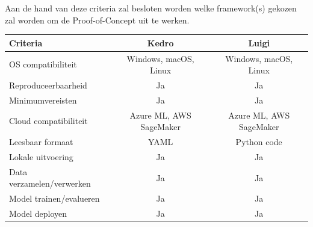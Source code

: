 Aan de hand van deze criteria zal besloten worden welke framework(s) gekozen zal worden om de Proof-of-Concept uit te werken.
\begin{table}[]
    \begin{tabular}{|l|c|c|}
        \hline
        Criteria & Kedro & Luigi \\
        \hline
        OS compatibiliteit & Windows, macOS, Linux & Windows, macOS, Linux \\
        Reproduceerbaarheid & Ja & Ja \\
        Minimumvereisten & Ja & Ja \\
        Cloud compatibiliteit & Azure ML, AWS SageMaker & Azure ML, AWS SageMaker \\
        Leesbaar formaat & YAML & Python code \\
        Lokale uitvoering & Ja & Ja \\
        Data verzamelen/verwerken & Ja & Ja \\
        Model trainen/evalueren & Ja & Ja \\
        Model deployen & Ja & Ja \\
        \hline
\end{tabular}
\end{table}